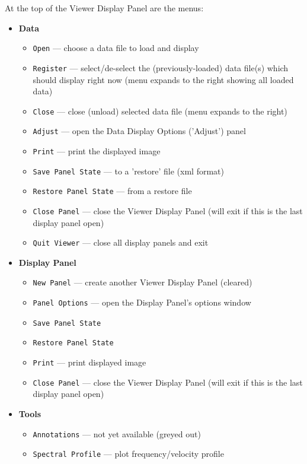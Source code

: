 At the top of the Viewer Display Panel are the menus:
\begin{itemize}
\item {\bf Data}
  \begin{itemize}
      \item  {\tt Open} --- choose a data file to load and display
      \item  {\tt Register} --- select/de-select the (previously-loaded)
             data file(s) which should display right now (menu expands
	     to the right showing all loaded data) 
      \item  {\tt Close} --- close (unload) selected data file (menu
             expands to the right)
      \item  {\tt Adjust} --- open the Data Display Options ('Adjust') panel 
      \item  {\tt Print} --- print the displayed image
      \item  {\tt Save Panel State} --- to a 'restore' file (xml format)
      \item  {\tt Restore Panel State} --- from a restore file
      \item  {\tt Close Panel} --- close the Viewer Display Panel (will exit
             if this is the last display panel open)
      \item  {\tt Quit Viewer} --- close all display panels and exit
  \end{itemize}
\item {\bf Display Panel}
  \begin{itemize}
      \item {\tt New Panel} --- create another Viewer Display Panel (cleared)
      \item {\tt Panel Options} --- open the Display Panel's options window
      \item  {\tt Save Panel State}
      \item  {\tt Restore Panel State}
      \item {\tt Print} --- print displayed image
      \item {\tt Close Panel} --- close the Viewer Display Panel (will exit if
            this is the last display panel open)
  \end{itemize}
\item {\bf Tools}
  \begin{itemize}
      \item {\tt Annotations} --- not yet available (greyed out) 
      \item {\tt Spectral Profile} --- plot frequency/velocity profile

\end{itemize}
\end{itemize}
